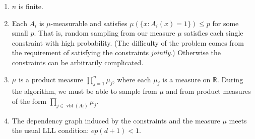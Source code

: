 \documentclass{article}
\newcommand{\Reals}%
  {\mathbb{R}}
\begin{document}
\begin{enumerate}
  \item $n$ is finite. \label{eqn:feas-finitedim-condition}
  \item Each $A_i$ is $\mu$-measurable and satisfies $\mu(\{x: A_i(x) = 1\}) \leq p$ for some small $p$.  That is, random sampling from our measure $\mu$ satisfies each single constraint with high probability.  (The difficulty of the problem comes from the requirement of satisfying the constraints \emph{jointly}.)  Otherwise the constraints can be arbitrarily complicated.  \label{eqn:feas-margprob-condition}
  \item $\mu$ is a product measure $\prod_{j=1}^{n} \mu_j$, where each $\mu_j$ is a measure on $\Reals$.  During the algorithm, we must be able to sample from $\mu$ and from product measures of the form $\prod_{j \in \operatorname{vbl}(A_i)} \mu_j$.  \label{eqn:feas-prodmeasure-condition}
  \item The dependency graph induced by the constraints and the measure $\mu$ meets the usual LLL condition: $e p (d+1) < 1$. \label{eqn:feas-lowdep-condition}
\end{enumerate}
\end{document}
